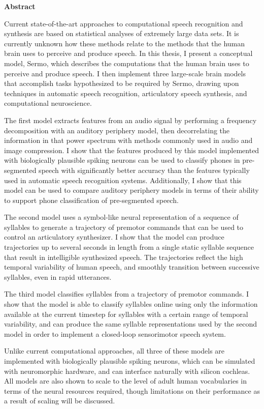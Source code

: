\begin{center}\textbf{Abstract}\end{center}

Current state-of-the-art approaches
to computational
speech recognition and synthesis
are based on statistical analyses
of extremely large data sets.
It is currently unknown how these methods
relate to the methods that the human brain
uses to perceive and produce speech.
In this thesis,
I present a conceptual model,
Sermo,
which describes the computations that
the human brain uses to
perceive and produce speech.
I then implement three large-scale brain models
that accomplish tasks
hypothesized to be required by Sermo,
drawing upon techniques
in automatic speech recognition,
articulatory speech synthesis,
and computational neuroscience.

The first model extracts features
from an audio signal by
performing a frequency decomposition
with an auditory periphery model,
then decorrelating the information
in that power spectrum
with methods commonly used in
audio and image compression.
I show that the features produced
by this model implemented
with biologically plausible spiking neurons
can be used to classify phones in
pre-segmented speech with significantly
better accuracy than the features
typically used in
automatic speech recognition systems.
Additionally, I show that this model
can be used to compare auditory periphery models
in terms of their ability to
support phone classification of pre-segmented speech.

The second model
uses a symbol-like neural representation
of a sequence of syllables
to generate a trajectory of premotor commands
that can be used to control
an articulatory synthesizer.
I show that the model
can produce trajectories
up to several seconds in length
from a single static syllable sequence
that result in
intelligible synthesized speech.
The trajectories reflect the
high temporal variability
of human speech,
and smoothly transition between
successive syllables,
even in rapid utterances.

The third model
classifies syllables
from a trajectory of premotor commands.
I show that the model is able to
classify syllables online
using only the information available
at the current timestep
for syllables with a certain range
of temporal variability,
and can produce the same
syllable representations
used by the second model
in order to implement
a closed-loop sensorimotor speech system.

Unlike current computational approaches,
all three of these models are implemented
with biologically plausible spiking neurons,
which can be simulated with neuromorphic hardware,
and can interface naturally with silicon cochleas.
All models are also shown to scale
to the level of adult human vocabularies
in terms of the neural resources required,
though limitations on their performance
as a result of scaling will be discussed.

\cleardoublepage
